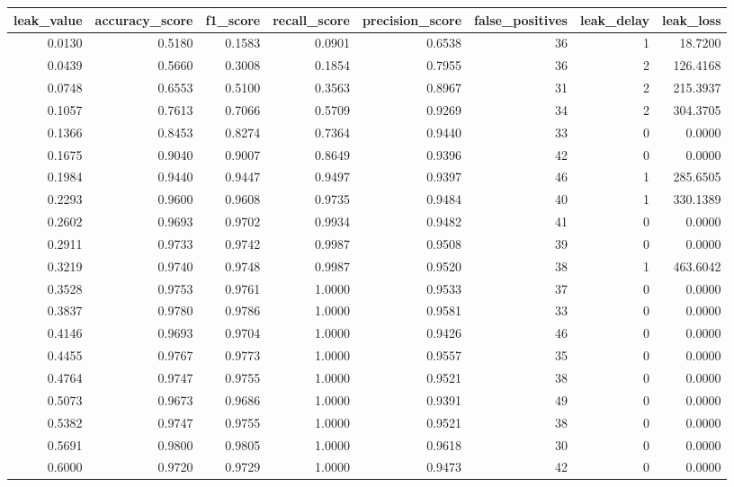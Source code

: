 \begin{tabular}{rrrrrrrr}
\toprule
leak\_value & accuracy\_score & f1\_score & recall\_score & precision\_score & false\_positives & leak\_delay & leak\_loss \\
\midrule
0.0130 & 0.5180 & 0.1583 & 0.0901 & 0.6538 & 36 & 1 & 18.7200 \\
0.0439 & 0.5660 & 0.3008 & 0.1854 & 0.7955 & 36 & 2 & 126.4168 \\
0.0748 & 0.6553 & 0.5100 & 0.3563 & 0.8967 & 31 & 2 & 215.3937 \\
0.1057 & 0.7613 & 0.7066 & 0.5709 & 0.9269 & 34 & 2 & 304.3705 \\
0.1366 & 0.8453 & 0.8274 & 0.7364 & 0.9440 & 33 & 0 & 0.0000 \\
0.1675 & 0.9040 & 0.9007 & 0.8649 & 0.9396 & 42 & 0 & 0.0000 \\
0.1984 & 0.9440 & 0.9447 & 0.9497 & 0.9397 & 46 & 1 & 285.6505 \\
0.2293 & 0.9600 & 0.9608 & 0.9735 & 0.9484 & 40 & 1 & 330.1389 \\
0.2602 & 0.9693 & 0.9702 & 0.9934 & 0.9482 & 41 & 0 & 0.0000 \\
0.2911 & 0.9733 & 0.9742 & 0.9987 & 0.9508 & 39 & 0 & 0.0000 \\
0.3219 & 0.9740 & 0.9748 & 0.9987 & 0.9520 & 38 & 1 & 463.6042 \\
0.3528 & 0.9753 & 0.9761 & 1.0000 & 0.9533 & 37 & 0 & 0.0000 \\
0.3837 & 0.9780 & 0.9786 & 1.0000 & 0.9581 & 33 & 0 & 0.0000 \\
0.4146 & 0.9693 & 0.9704 & 1.0000 & 0.9426 & 46 & 0 & 0.0000 \\
0.4455 & 0.9767 & 0.9773 & 1.0000 & 0.9557 & 35 & 0 & 0.0000 \\
0.4764 & 0.9747 & 0.9755 & 1.0000 & 0.9521 & 38 & 0 & 0.0000 \\
0.5073 & 0.9673 & 0.9686 & 1.0000 & 0.9391 & 49 & 0 & 0.0000 \\
0.5382 & 0.9747 & 0.9755 & 1.0000 & 0.9521 & 38 & 0 & 0.0000 \\
0.5691 & 0.9800 & 0.9805 & 1.0000 & 0.9618 & 30 & 0 & 0.0000 \\
0.6000 & 0.9720 & 0.9729 & 1.0000 & 0.9473 & 42 & 0 & 0.0000 \\
\bottomrule
\end{tabular}
